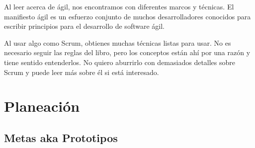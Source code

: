 \documentclass[12pt, fleqn]{report}                             %
\theoremstyle{break}                                            %
\begin{document}
    	Al leer acerca de ágil, nos encontramos con diferentes marcos y técnicas. 
    	El manifiesto ágil es un esfuerzo conjunto de muchos desarrolladores conocidos para escribir
    	principios para el desarrollo de software ágil.
    
    	Al usar algo como Scrum, obtienes muchas técnicas listas para usar. No es necesario seguir las reglas del libro,
    	pero los conceptos están ahí por una razón y tiene sentido entenderlos. No quiero aburrirlo con demasiados
    	detalles sobre Scrum y puede leer más sobre él si está interesado.
    
    
    
    
    

    
    
    
\chapter{Planeación}

    \clearpage

    \section{Metas aka Prototipos}
    
\end{document}
